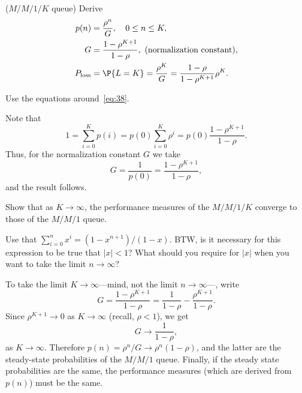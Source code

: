 \begin{exercise} ($M/M/1/K$ queue)
 Derive 
\begin{subequations}\label{eq:8}
 \begin{align}
p(n) &=  \frac{\rho^n}G, \quad 0\leq n \leq K,\\
G &= \frac{1-\rho^{K+1}}{1-\rho}, \text{ (normalization constant)},\\
P_{\text{loss}} &= \P{L=K} = \frac{\rho^K}G = \frac{1-\rho}{1-\rho^{K+1}} \rho^K.
\end{align}
\end{subequations}
\begin{hint}
  Use the equations around~\eqref{eq:38}.
\end{hint}
  \begin{solution}
Note that 
\begin{equation*}
1 = \sum_{i=0}^K p(i) = p(0)\sum_{i=0}^K \rho^i  = p(0) \frac{1-\rho^{K+1}}{1-\rho}. 
\end{equation*}
Thus, for the normalization constant $G$ we take 
\begin{equation*}
G=\frac 1{p(0)} = \frac{1-\rho^{K+1}}{1-\rho},
\end{equation*}
and the result follows. 
  \end{solution}
\end{exercise}

\begin{exercise} 
   Show that as $K\to\infty$, the performance measures of the $M/M/1/K$ converge to those of the $M/M/1$ queue. 
  \begin{hint}
Use that $\sum_{i=0}^n x^i = (1-x^{n+1})/(1-x)$. BTW, is it
    necessary for this expression to be true that $|x|<1$? What should
    you require for $|x|$ when you want to take the limit
    $n\to\infty$?
  \end{hint}
  \begin{solution}
To take the limit $K\to\infty$---mind, not the limit $n\to\infty$---, write
\begin{equation*}
G= \frac{1-\rho^{K+1}}{1-\rho} = \frac{1}{1-\rho} -\frac{\rho^{K+1}}{1-\rho}.
\end{equation*}
Since $\rho^{K+1}\to 0$ as $K\to \infty$ (recall, $\rho<1$),  we get
\begin{equation*}
G \to \frac{1}{1-\rho}, 
\end{equation*}
as $K\to\infty$.  Therefore $p(n)=\rho^n/G \to \rho^n(1-\rho)$, and
the latter are the steady-state probabilities of the $M/M/1$
queue. Finally, if the steady state probabilities are the same, the
performance measures (which are derived from $p(n)$) must be the same.
  \end{solution}
\end{exercise}


